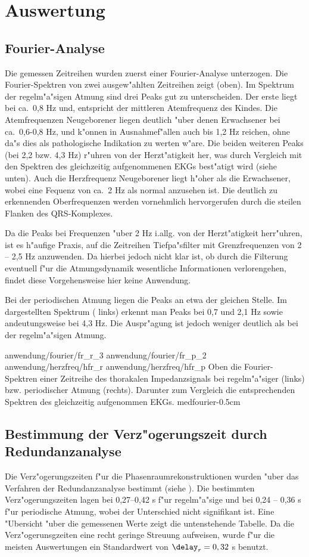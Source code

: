 \section{Auswertung} 

\subsection{Fourier-Analyse}
Die gemessen Zeitreihen wurden zuerst einer Fourier-Analyse
unterzogen. Die Fourier-Spektren von zwei ausgew"ahlten Zeitreihen zeigt 
(oben). Im Spektrum der regelm"a"sigen Atmung sind drei Peaks gut zu unterscheiden. Der
erste liegt bei ca.\ 0,8 Hz und, entspricht der mittleren Atemfrequenz des Kindes. Die
Atemfrequenzen Neugeborener liegen deutlich "uber denen Erwachsener bei ca.\ 
0,6-0,8 Hz, und k"onnen in Ausnahmef"allen auch bis 1,2 Hz reichen, ohne da"s dies als
pathologische Indikation zu werten w"are. Die beiden weiteren Peaks (bei 2,2 bzw. 4,3 Hz)
r"uhren von der Herzt"atigkeit her, was durch Vergleich mit den Spektren des gleichzeitig
aufgenommenen EKGs best"atigt wird (siehe \psref{medfourier} unten). Auch die Herzfrequenz
Neugeborener liegt h"oher als die Erwachsener, wobei eine Fequenz von ca.\ 2 Hz als normal
anzusehen ist. Die deutlich zu erkennenden Oberfrequenzen werden vornehmlich hervorgerufen
durch die steilen Flanken des QRS-Komplexes.

Da die Peaks bei Frequenzen "uber 2 Hz i.allg. von der Herzt"atigkeit herr"uhren, ist es
h"aufige Praxis, auf die Zeitreihen Tiefpa"sfilter mit Grenzfrequenzen von 2 -- 2,5 Hz
anzuwenden. Da hierbei jedoch nicht klar ist, ob durch die Filterung eventuell f"ur die
Atmungsdynamik wesentliche Informationen verlorengehen, findet diese Vorgehensweise hier
keine Anwendung. 

Bei der periodischen Atmung liegen die Peaks an etwa der gleichen Stelle. Im dargestellten
Spektrum (\psref{medfourier} links) erkennt man Peaks bei 0,7 und 2,1 Hz sowie
andeutungsweise bei 4,3 Hz.  Die Auspr"agung ist jedoch weniger deutlich als bei der
regelm"a"sigen Atmung.


\epsfigfour
{anwendung/fourier/fr_r_3}
{anwendung/fourier/fr_p_2}
{anwendung/herzfreq/hfr_r}
{anwendung/herzfreq/hfr_p}
{Oben die Fourier-Spektren einer Zeitreihe des thorakalen Impedanzsignals bei regelm"a"siger (links)
  bzw. periodischer Atmung (rechts).  Darunter zum Vergleich die entsprechenden Spektren
  des gleichzeitig aufgenommen EKGs.
}
{medfourier}{-0.5cm}


\subsection{Bestimmung der Verz"ogerungszeit durch Redundanzanalyse}
Die Verz"ogerungszeiten f"ur die Phasenraumrekonstruktionen wurden "uber das Verfahren der 
Redundanzanalyse bestimmt (siehe \psref{medredund}).  Die bestimmten Verz"ogerungszeiten
lagen bei 0,27--0,42 s f"ur regelm"a"sige und bei 0,24 -- 0,36 s f"ur periodische Atmung,
wobei der Unterschied nicht signifikant ist. Eine "Ubersicht "uber die gemessenen Werte
zeigt die untenstehende Tabelle. Da die Verz"ogerunsgzeiten eine recht geringe Streuung
aufweisen, wurde f"ur die meisten Auswertungen ein Standardwert von $\delay_r=0,32$ s
benutzt. 

